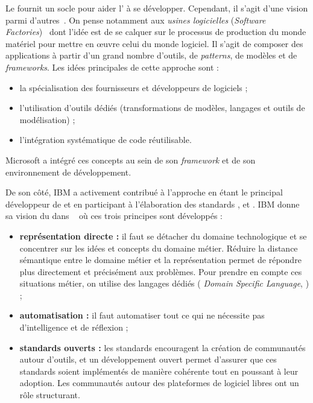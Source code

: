 Le {\mda} fournit un socle pour aider l'{\idm} à se développer. Cependant, il
s'agit d'une vision parmi d'autres~\cite{Favre2006}. On pense notamment aux
\emph{usines logicielles} (\emph{Software Factories})~\cite{Greenfield2003}
dont l'idée est de se calquer sur le processus de production du monde matériel
pour mettre en œuvre celui du monde logiciel. Il s'agit de composer des
applications à partir d'un grand nombre d'outils, de \emph{patterns}, de
modèles et de \emph{frameworks}. Les idées principales de cette approche sont :
\begin{itemize}
  \item la spécialisation des fournisseurs et développeurs de logiciels ;
  \item l'utilisation d'outils dédiés (transformations de modèles, langages et
    outils de modélisation) ;
  \item l'intégration systématique de code réutilisable.
\end{itemize}
Microsoft a intégré ces concepts au sein de son \emph{framework} {\dotnet} et
de son environnement de développement. %

De son côté, IBM a activement contribué à l'approche {\mda} %
en étant le principal développeur de {\uml} et en participant à l'élaboration
des standards {\mof}, {\xmi} et {\cwm}. IBM donne sa vision du {\mda} dans
~\cite{Booch2004} où ces trois principes sont développés :

\begin{itemize}
  \item \textbf{représentation directe :} il faut se détacher du domaine
    technologique et se concentrer sur les idées et concepts du domaine métier.
    Réduire la distance sémantique entre le domaine métier et la représentation
    permet de répondre plus directement et précisément aux problèmes. Pour
    prendre en compte ces situations métier, on utilise des langages dédiés (
    \emph{Domain Specific Language}, {\dsl}) ;
  
  \item \textbf{automatisation :} il faut automatiser tout ce qui ne nécessite
    pas d'intelligence et de réflexion ;%

  \item \textbf{standards ouverts :} les standards encouragent la création de
    communautés autour d'outils, et un développement ouvert permet d'assurer
    que ces standards soient implémentés de manière cohérente tout en poussant
    à leur adoption. Les communautés autour des plateformes  de logiciel libres
    ont un rôle structurant.
\end{itemize}


